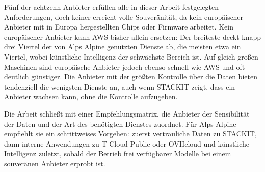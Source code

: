 Fünf der achtzehn Anbieter erfüllen alle in dieser Arbeit festgelegten
Anforderungen, doch keiner erreicht volle Souveränität, da kein europäischer Anbieter
mit in Europa hergestellten Chips oder Firmware arbeitet. Kein europäischer Anbieter
kann \acs{AWS} bisher allein ersetzen: Der breiteste deckt knapp drei Viertel der von
Alps Alpine genutzten Dienste ab, die meisten etwa ein Viertel, wobei künstliche
Intelligenz der schwächste Bereich ist. Auf gleich großen Maschinen sind europäische
Anbieter jedoch ebenso schnell wie \acs{AWS} und oft deutlich günstiger. Die Anbieter
mit der größten Kontrolle über die Daten bieten tendenziell die wenigsten Dienste an,
auch wenn STACKIT zeigt, dass ein Anbieter wachsen kann, ohne die Kontrolle
aufzugeben.

Die Arbeit schließt mit einer Empfehlungsmatrix, die Anbieter der Sensibilität der
Daten und der Art des benötigten Dienstes zuordnet. Für Alps Alpine empfiehlt sie ein
schrittweises Vorgehen: zuerst vertrauliche Daten zu STACKIT, dann interne Anwendungen
zu T-Cloud Public oder OVHcloud und künstliche Intelligenz zuletzt, sobald der Betrieb
frei verfügbarer Modelle bei einem souveränen Anbieter erprobt ist.
